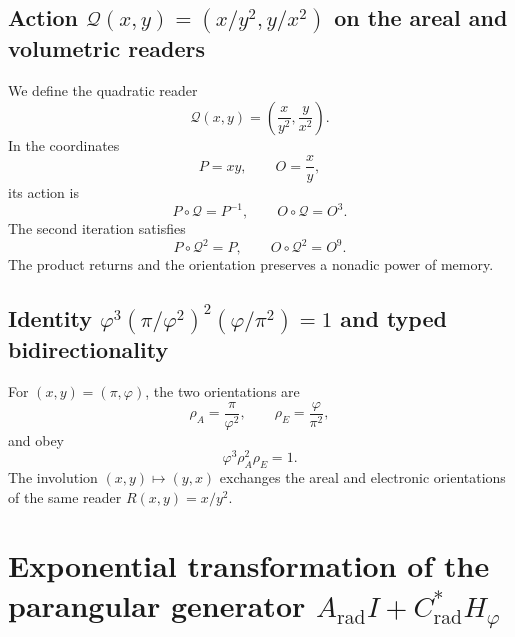 \subsection{Action \texorpdfstring{\(\mathcal Q(x,y)=(x/y^2,y/x^2)\)}{Q(x,y)=(x/y^2,y/x^2)} on the areal and volumetric readers}

We define the quadratic reader
\begin{equation}
 \mathcal Q(x,y)
 =\left(\frac{x}{y^2},\frac{y}{x^2}\right).
 \label{eq:l9s102:euler-q}
\end{equation}
In the coordinates
\begin{equation}
 P=xy,
 \qquad O=\frac{x}{y},
 \label{eq:l9s102:euler-po}
\end{equation}
its action is
\begin{equation}
 P\circ\mathcal Q=P^{-1},
 \qquad
 O\circ\mathcal Q=O^3.
 \label{eq:l9s102:euler-q-action}
\end{equation}
The second iteration satisfies
\begin{equation}
 \boxed{
 P\circ\mathcal Q^2=P,
 \qquad
 O\circ\mathcal Q^2=O^9.}
 \label{eq:l9s102:euler-q2}
\end{equation}
The product returns and the orientation preserves a nonadic power of memory.

\subsection{Identity \texorpdfstring{\(\varphi^3(\pi/\varphi^2)^2(\varphi/\pi^2)=1\)}{phi^3(pi/phi^2)^2(phi/pi^2)=1} and typed bidirectionality}

For \((x,y)=(\pi,\varphi)\), the two orientations are
\begin{equation}
 \rho_A=\frac{\pi}{\varphi^2},
 \qquad
 \rho_E=\frac{\varphi}{\pi^2},
 \label{eq:l9s102:euler-rho-a-e}
\end{equation}
and obey
\begin{equation}
 \boxed{\varphi^3\rho_A^2\rho_E=1.}
 \label{eq:l9s102:euler-ambivalencia-identidad}
\end{equation}
The involution \((x,y)\mapsto(y,x)\) exchanges the areal and
electronic orientations of the same reader \(R(x,y)=x/y^2\).

\section{Exponential transformation of the parangular generator \texorpdfstring{\(A_{\mathrm{rad}}I+C^*_{\mathrm{rad}}H_\varphi\)}{A_rad I+C*_rad H_phi}}
\label{sec:l9s102:euler-accion-par-angular}

